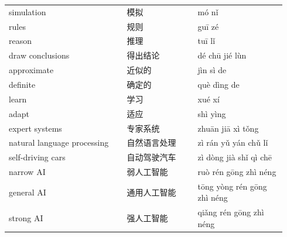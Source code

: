 \documentclass[11pt]{article}
\begin{document}
\begin{longtable}{@{}p{0.40\linewidth}p{0.24\linewidth}p{0.30\linewidth}@{}}
simulation & 模拟 & mó nǐ \\
rules & 规则 & guī zé \\
reason & 推理 & tuī lǐ \\
draw conclusions & 得出结论 & dé chū jié lùn \\
approximate & 近似的 & jìn sì de \\
definite & 确定的 & què dìng de \\
learn & 学习 & xué xí \\
adapt & 适应 & shì yìng \\
expert systems & 专家系统 & zhuān jiā xì tǒng \\
natural language processing & 自然语言处理 & zì rán yǔ yán chǔ lǐ \\
self-driving cars & 自动驾驶汽车 & zì dòng jià shǐ qì chē \\
narrow AI & 弱人工智能 & ruò rén gōng zhì néng \\
general AI & 通用人工智能 & tōng yòng rén gōng zhì néng \\
strong AI & 强人工智能 & qiǎng rén gōng zhì néng \\
\end{longtable}
\end{document}
